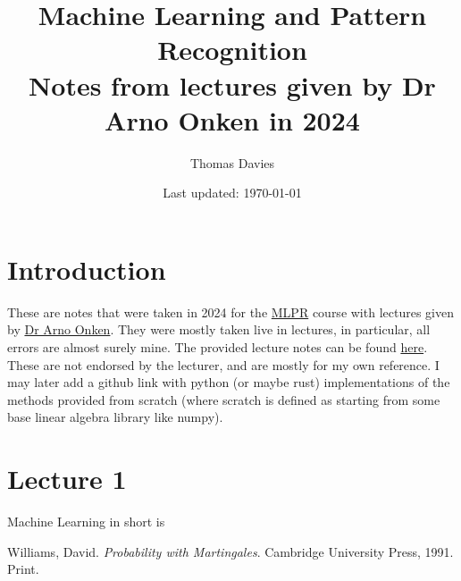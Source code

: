 \documentclass[letterpaper, 12pt]{article}
\newcommand{\1}{\mathds{1}}	%
\theoremstyle{definition}
\begin{document}

\title{Machine Learning and Pattern Recognition \\[1em]
\normalsize Notes from lectures given by Dr Arno Onken in 2024}


\author{\normalsize Thomas Davies}
\date{\normalsize\vspace{-1ex} Last updated: \today}


\maketitle
\tableofcontents\label{sec:contents}

%


\newpage
\section{Introduction}
These are notes that were taken in 2024 for the \href{https://mlpr.inf.ed.ac.uk/2024/}{MLPR} course with lectures given by \href{https://homepages.inf.ed.ac.uk/aonken/}{Dr Arno Onken}. 
They were mostly taken live in lectures, in particular, all errors are almost surely mine.
The provided lecture notes can be found \href{https://mlpr.inf.ed.ac.uk/2024/notes/}{here}. These are not endorsed by the lecturer, and are mostly for my own reference.
I may later add a github link with python (or maybe rust) implementations of the methods provided from scratch (where scratch is defined as starting from some base linear algebra library like numpy).

\section{Lecture 1}
Machine Learning in short is 


\newpage
\begin{thebibliography}{1}

   Williams, David.
   \textit{Probability with Martingales}.
   Cambridge University Press, 1991.
   Print.


\end{thebibliography}
\end{document}
